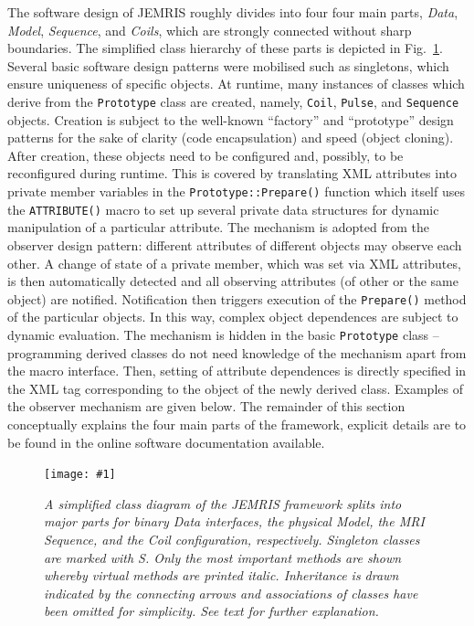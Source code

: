 \documentclass[journal,onecolumn,12pt]{IEEEtran}
\newcommand{\epsfig}[5]{
 \begin{figure}[#4!]
   \begin{center}
    \texttt{[image: \#1]}
    \caption{{\sl #2}\label{#3}}
   \end{center}
 \end{figure}}
\begin{document}
The software design of JEMRIS roughly divides into four four main parts, {\it Data}, {\it Model}, {\it Sequence}, and
{\it Coils}, which are strongly connected without sharp boundaries. The simplified class hierarchy of these parts is
depicted in Fig.~\ref{fig:classes}. Several basic software design patterns were mobilised \cite{gamma} such as
singletons, which ensure uniqueness of specific objects. At runtime, many instances of classes which derive from the
\verb+Prototype+ class are created, namely, \verb+Coil+, \verb+Pulse+, and \verb+Sequence+ objects. Creation is subject
to the well-known ``factory'' and ``prototype'' design patterns for the sake of clarity (code encapsulation) and speed
(object cloning). After creation, these objects need to be configured and, possibly, to be reconfigured during
runtime. This is covered by translating XML attributes into private member variables in the \verb+Prototype::Prepare()+
function which itself uses the \verb+ATTRIBUTE()+ macro to set up several private data structures for dynamic
manipulation of a particular attribute. The mechanism is adopted from the observer design pattern: different attributes
of different objects may observe each other. A change of state of a private member, which was set via XML attributes, is
then automatically detected and all observing attributes (of other or the same object) are notified. Notification then
triggers execution of the \verb+Prepare()+ method of the particular objects. In this way, complex object dependences are
subject to dynamic evaluation. The mechanism is hidden in the basic \verb+Prototype+ class -- programming derived
classes do not need knowledge of the mechanism apart from the macro interface. Then, setting of attribute dependences is
directly specified in the XML tag corresponding to the object of the newly derived class. Examples of the observer
mechanism are given below. The remainder of this section conceptually explains the four main parts of the framework,
explicit details are to be found in the online software documentation available.\\

\epsfig{fig/classes.eps}{A simplified class diagram of the JEMRIS framework splits into major parts for binary {\it
    Data} interfaces, the physical {\it Model}, the MRI {\it Sequence}, and the {\it Coil} configuration,
  respectively. Singleton classes are marked with {\it S}. Only the most important methods are shown whereby virtual
  methods are printed italic. Inheritance is drawn indicated by the connecting arrows and associations of classes have
  been omitted for simplicity. See text for further explanation.}{fig:classes}{htbp}{1.0}
\end{document}
